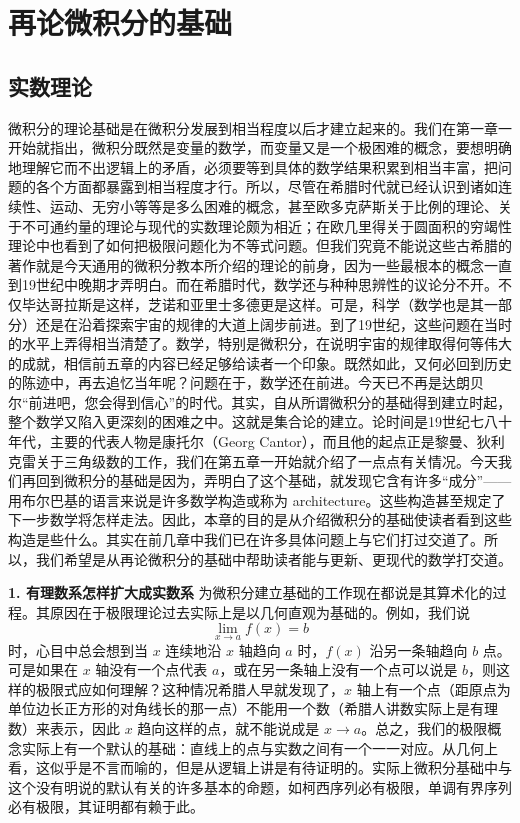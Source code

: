 \chapter{再论微积分的基础}

\section{实数理论}

微积分的理论基础是在微积分发展到相当程度以后才建立起来的。我们在第一章一开始就指出，微积分既然是变量的数学，而变量又是一个极困难的概念，要想明确地理解它而不出逻辑上的矛盾，必须要等到具体的数学结果积累到相当丰富，把问题的各个方面都暴露到相当程度才行。所以，尽管在希腊时代就已经认识到诸如连续性、运动、无穷小等等是多么困难的概念，甚至欧多克萨斯关于比例的理论、关于不可通约量的理论与现代的实数理论颇为相近；在欧几里得关于圆面积的穷竭性理论中也看到了如何把极限问题化为不等式问题。但我们究竟不能说这些古希腊的著作就是今天通用的微积分教本所介绍的理论的前身，因为一些最根本的概念一直到19世纪中晚期才弄明白。而在希腊时代，数学还与种种思辨性的议论分不开。不仅毕达哥拉斯是这样，芝诺和亚里士多德更是这样。可是，科学（数学也是其一部分）还是在沿着探索宇宙的规律的大道上阔步前进。到了19世纪，这些问题在当时的水平上弄得相当清楚了。数学，特别是微积分，在说明宇宙的规律取得何等伟大的成就，相信前五章的内容已经足够给读者一个印象。既然如此，又何必回到历史的陈迹中，再去追忆当年呢？问题在于，数学还在前进。今天已不再是达朗贝尔“前进吧，您会得到信心”的时代。其实，自从所谓微积分的基础得到建立时起，整个数学又陷入更深刻的困难之中。这就是集合论的建立。论时间是19世纪七八十年代，主要的代表人物是康托尔（Georg Cantor），而且他的起点正是黎曼、狄利克雷关于三角级数的工作，我们在第五章一开始就介绍了一点点有关情况。今天我们再回到微积分的基础是因为，弄明白了这个基础，就发现它含有许多“成分”——用布尔巴基的语言来说是许多数学构造或称为 architecture。这些构造甚至规定了下一步数学将怎样走法。因此，本章的目的是从介绍微积分的基础使读者看到这些构造是些什么。其实在前几章中我们已在许多具体问题上与它们打过交道了。所以，我们希望是从再论微积分的基础中帮助读者能与更新、更现代的数学打交道。

\noindent\textbf{1. 有理数系怎样扩大成实数系}\quad
为微积分建立基础的工作现在都说是其算术化的过程。其原因在于极限理论过去实际上是以几何直观为基础的。例如，我们说
\[
 \lim_{x\to a}f(x)=b
\]
时，心目中总会想到当 $x$ 连续地沿 $x$ 轴趋向 $a$ 时，$f(x)$ 沿另一条轴趋向 $b$ 点。可是如果在 $x$ 轴没有一个点代表 $a$，或在另一条轴上没有一个点可以说是 $b$，则这样的极限式应如何理解？这种情况希腊人早就发现了，$x$ 轴上有一个点（距原点为单位边长正方形的对角线长的那一点）不能用一个数（希腊人讲数实际上是有理数）来表示，因此 $x$ 趋向这样的点，就不能说成是 $x\to a$。总之，我们的极限概念实际上有一个默认的基础：直线上的点与实数之间有一个一一对应。从几何上看，这似乎是不言而喻的，但是从逻辑上讲是有待证明的。实际上微积分基础中与这个没有明说的默认有关的许多基本的命题，如柯西序列必有极限，单调有界序列必有极限，其证明都有赖于此。


